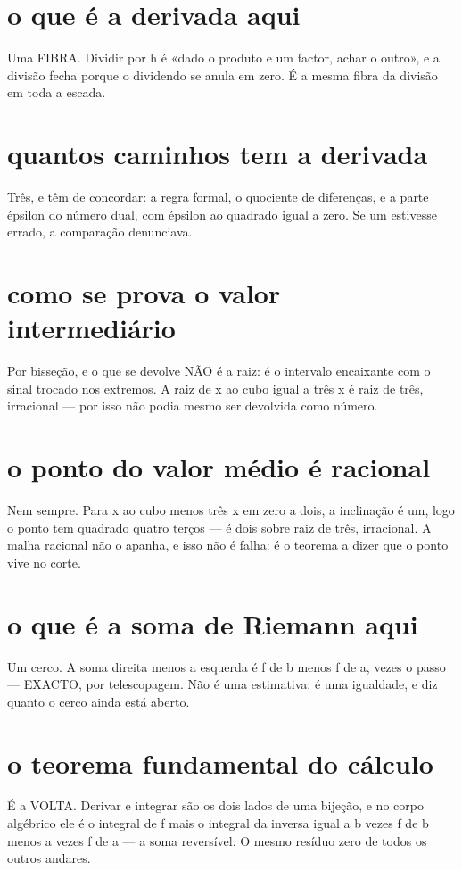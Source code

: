 \documentclass[11pt,a4paper]{article}
\begin{document}
\section{o que é a derivada aqui}
Uma FIBRA. Dividir por h é «dado o produto e um factor, achar o outro», e a divisão
fecha porque o dividendo se anula em zero. É a mesma fibra da divisão em toda a escada.

\section{quantos caminhos tem a derivada}
Três, e têm de concordar: a regra formal, o quociente de diferenças, e a parte épsilon
do número dual, com épsilon ao quadrado igual a zero. Se um estivesse errado, a
comparação denunciava.

\section{como se prova o valor intermediário}
Por bisseção, e o que se devolve NÃO é a raiz: é o intervalo encaixante com o sinal
trocado nos extremos. A raiz de x ao cubo igual a três x é raiz de três, irracional —
por isso não podia mesmo ser devolvida como número.

\section{o ponto do valor médio é racional}
Nem sempre. Para x ao cubo menos três x em zero a dois, a inclinação é um, logo o ponto
tem quadrado quatro terços — é dois sobre raiz de três, irracional. A malha racional não
o apanha, e isso não é falha: é o teorema a dizer que o ponto vive no corte.

\section{o que é a soma de Riemann aqui}
Um cerco. A soma direita menos a esquerda é f de b menos f de a, vezes o passo —
EXACTO, por telescopagem. Não é uma estimativa: é uma igualdade, e diz quanto o cerco
ainda está aberto.

\section{o teorema fundamental do cálculo}
É a VOLTA. Derivar e integrar são os dois lados de uma bijeção, e no corpo algébrico ele
é o integral de f mais o integral da inversa igual a b vezes f de b menos a vezes f de a
— a soma reversível. O mesmo resíduo zero de todos os outros andares.
\end{document}
